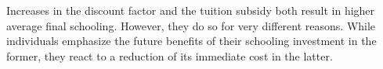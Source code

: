 \noindent Increases in the discount factor and the tuition subsidy both result in higher average final schooling. However, they do so for very different reasons. While individuals emphasize the future benefits of their schooling investment in the former, they react to a reduction of its immediate cost in the latter.
